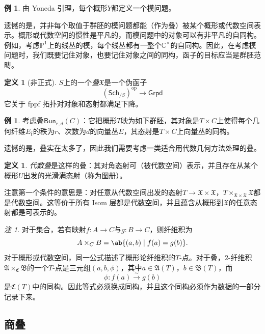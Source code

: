 \documentclass{amsart}
\theoremstyle{definition}
\newtheorem{defn}[thm]{定义}
\newtheorem{exm}[thm]{例}
\theoremstyle{remark}
\newtheorem{rmk}[thm]{注}
\theoremstyle{plain}
\theoremstyle{definition}
\theoremstyle{remark}
\newcommand{\C}{\mathbb{C}}
\renewcommand{\P}{\mathbb{P}}
\newcommand{\mf}[1]{\mathfrak{#1}}
\newcommand{\mr}[1]{\mathrm{#1}}
\newcommand{\ms}[1]{\mathsf{#1}}
\newcommand{\1}{\mathbf{1}}
\newcommand{\2}{\mathbf{2}}
\newcommand{\3}{\mathbf{3}}
\begin{document}
\begin{exm}
    由 Yoneda 引理，每个概形\(Y\)都定义一个模问题。
\end{exm}

遗憾的是，并非每个取值于群胚的模问题都能（作为叠）被某个概形或代数空间表示。概形或代数空间的惯性是平凡的，而模问题中的对象可以有非平凡的自同构。例如，考虑\(\P^1\)上的线丛的模，每个线丛都有一整个\(\C^{\times}\)的自同构。因此，在考虑模问题时，我们既要记住对象，也要记住对象之间的同构，函子的目标应当是群胚范畴。

\begin{defn}[非正式]
    \(S\)上的一个\textit{叠}\(\mf{X}\)是一个伪函子
    \[ (\ms{Sch}_{/S})^{\mr{op}} \to \ms{Grpd} \]
    它关于 fppf 拓扑对对象和态射都满足下降。
\end{defn}

\begin{exm}
    考虑叠\(\ms{Bun}_{r,d}(C)\)：它把概形\(T\)映为如下群胚，其对象是\(T\times C\)上使得每个几何纤维\(E_{\bar t}\)的秩为\(r\)、次数为\(d\)的向量丛\(E\)，其态射是\(T\times C\)上向量丛的同构。
\end{exm}

遗憾的是，叠实在太多了，因此我们需要考虑一类适合用代数几何方法处理的叠。

\begin{defn}
    \textit{代数叠}是这样的叠：其对角态射可（被代数空间）表示，并且存在从某个概形\(U\)出发的光滑满态射（称为图册）。
\end{defn}

注意第一个条件的意思是：对任意从代数空间出发的态射\(T \to \mf{X} \times \mf{X}\)，\(T \times_{\mf{X} \times \mf{X}} \mf{X}\)都是代数空间。这等价于所有 Isom 层都是代数空间，并且蕴含从概形到\(\mf{X}\)的任意态射都是可表示的。

\begin{rmk}
    对于集合，若有映射\(f\colon A\to C\)与\(g\colon B\to C\)，则纤维积为
    \[ 
        A\times_C B=\ab\{(a,b)\mid f(a)=g(b)\}. 
    \]
    对于概形或代数空间，同一公式描述了概形论纤维积的\(T\)-点。对于叠，\(2\)-纤维积\(\mf{A}\times_{\mf{C}}\mf{B}\)的一个\(T\)-点是三元组\((a,b,\phi)\)，其中\(a\in\mf{A}(T)\)，\(b\in\mf{B}(T)\)，而
    \[ 
        \phi\colon f(a)\xrightarrow{\sim}g(b) 
    \]
    是\(\mf{C}(T)\)中的同构。因此等式必须换成同构，并且这个同构必须作为数据的一部分记录下来。
\end{rmk}


\subsection{商叠}%
\label{sub:Quotient stacks}
\end{document}
